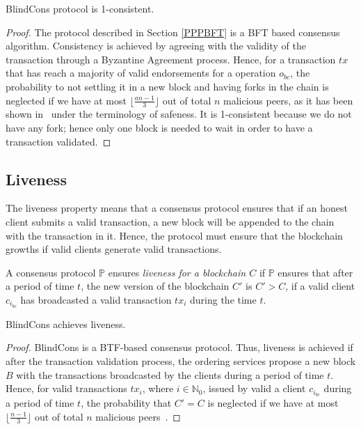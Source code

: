 \documentclass[conference]{llncs}
\newcommand{\name}{BlindCons}
\begin{document}
\begin{theorem} \name{} protocol is 1-consistent.
\end{theorem}

\begin{proof}
The protocol described in Section \ref{PPPBFT} is a BFT based consensus algorithm. Consistency is achieved by agreeing with the validity of the transaction through a Byzantine Agreement process. Hence, for a transaction $tx$ that has reach a majority of valid endorsements for a operation $o_{bc}$, the probability to not settling it in a new block and having forks in the chain is neglected if we have at most $\lfloor\frac{an-1}{3}\rfloor$ out of total $n$ malicious peers, as it has been shown in~\cite{castro1999practical,li2007beyond} under the terminology of safeness. It is 1-consistent because we do not have any fork; hence only one block is needed to wait in order to have a transaction validated.
\end{proof}

\subsection{Liveness}

The liveness property means that a consensus protocol ensures that if an honest client submits a valid transaction, a new block will be appended to the chain with the transaction in it. Hence, the protocol must ensure that the blockchain growths if valid clients generate valid transactions.

\begin{definition}[Liveness]
A consensus protocol $\mathbb{P}$ ensures \emph{liveness for a blockchain $C$} if $\mathbb{P}$ ensures that after a period of time $t$, the new version of the blockchain $C'$ is $C' > C$, if a valid client $c_{i_{bc}}$ has broadcasted a valid transaction $tx_i$ during the time $t$. 
\end{definition}

\begin{theorem}
\name{} achieves liveness.
\end{theorem}

\begin{proof}
\name{} is a BTF-based consensus protocol. Thus, liveness is achieved if after the transaction validation process, the ordering services propose a new block $B$ with the transactions broadcasted by the clients during a period of time $t$. Hence, for valid transactions $tx_i$, where $i\in \mathbb{N}_0$, issued by valid a client $c_{i_{bc}}$ during a period of time $t$, the probability that $C'= C$ is neglected if we have at most $\lfloor\frac{n-1}{3}\rfloor$ out of total $n$ malicious peers~\cite{castro1999practical}.
\end{proof}
\end{document}
